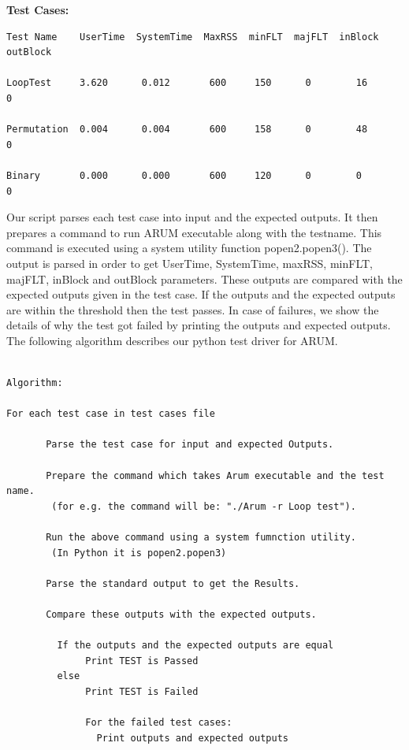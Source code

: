 \documentclass[11pt,letterpaper,oneside]{article}
\begin{document}
{\bf Test Cases:}

\begin{verbatim}
Test Name    UserTime  SystemTime  MaxRSS  minFLT  majFLT  inBlock  outBlock

LoopTest     3.620      0.012       600     150      0        16       0

Permutation  0.004      0.004       600     158      0        48       0

Binary       0.000      0.000       600     120      0        0        0

\end{verbatim}

Our script parses each test case into input and the expected outputs. It then prepares a command to run ARUM executable along with the testname. This command is executed using a system utility function popen2.popen3(). The output is parsed in order to get UserTime, SystemTime, maxRSS, minFLT, majFLT, inBlock and outBlock parameters. These outputs are compared with the expected outputs given in the test case. If the outputs and the expected outputs are within the threshold then the test passes. In case of failures, we show the details of why the test got failed by printing the outputs and expected outputs. The following algorithm describes our python test driver for ARUM.\newline

\begin{verbatim}

Algorithm:

For each test case in test cases file

       Parse the test case for input and expected Outputs.
     
       Prepare the command which takes Arum executable and the test name.
        (for e.g. the command will be: "./Arum -r Loop test").
       
       Run the above command using a system fumnction utility.
        (In Python it is popen2.popen3)

       Parse the standard output to get the Results.

       Compare these outputs with the expected outputs.
       
         If the outputs and the expected outputs are equal
              Print TEST is Passed
         else 
              Print TEST is Failed

              For the failed test cases:
                Print outputs and expected outputs
\end{verbatim}
\end{document}
